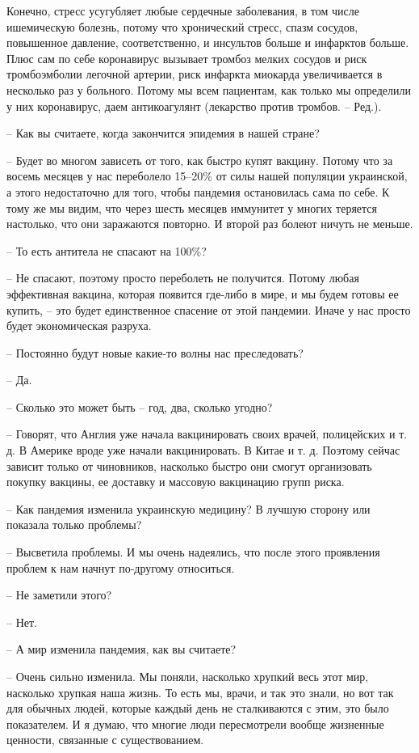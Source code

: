 Конечно, стресс усугубляет любые сердечные заболевания, в том числе ишемическую
болезнь, потому что хронический стресс, спазм сосудов, повышенное давление,
соответственно, и инсультов больше и инфарктов больше. Плюс сам по себе
коронавирус вызывает тромбоз мелких сосудов и риск тромбоэмболии легочной
артерии, риск инфаркта миокарда увеличивается в несколько раз у больного.
Потому мы всем пациентам, как только мы определили у них коронавирус, даем
антикоагулянт (лекарство против тромбов. – Ред.).

– Как вы считаете, когда закончится эпидемия в нашей стране? 

– Будет во многом зависеть от того, как быстро купят вакцину. Потому что за
восемь месяцев у нас переболело 15–20\% от силы нашей популяции украинской, а
этого недостаточно для того, чтобы пандемия остановилась сама по себе. К тому
же мы видим, что через шесть месяцев иммунитет у многих теряется настолько, что
они заражаются повторно. И второй раз болеют ничуть не меньше.

– То есть антитела не спасают на 100\%?

– Не спасают, поэтому просто переболеть не получится. Потому любая эффективная
вакцина, которая появится где-либо в мире, и мы будем готовы ее купить, – это
будет единственное спасение от этой пандемии. Иначе у нас просто будет
экономическая разруха.  

– Постоянно будут новые какие-то волны нас преследовать?

– Да.

– Сколько это может быть – год, два, сколько угодно?

– Говорят, что Англия уже начала вакцинировать своих врачей, полицейских и т.
д. В Америке вроде уже начали вакцинировать. В Китае и т. д. Поэтому сейчас
зависит только от чиновников, насколько быстро они смогут организовать покупку
вакцины, ее доставку и массовую вакцинацию групп риска.

– Как пандемия изменила украинскую медицину? В лучшую сторону или показала
только проблемы?

– Высветила проблемы. И мы очень надеялись, что после этого проявления проблем
к нам начнут по-другому относиться.

– Не заметили этого?

– Нет.

– А мир изменила пандемия, как вы считаете?

– Очень сильно изменила. Мы поняли, насколько хрупкий весь этот мир, насколько
хрупкая наша жизнь. То есть мы, врачи, и так это знали, но вот так для обычных
людей, которые каждый день не сталкиваются с этим, это было показателем. И я
думаю, что многие люди пересмотрели вообще жизненные ценности, связанные с
существованием.

